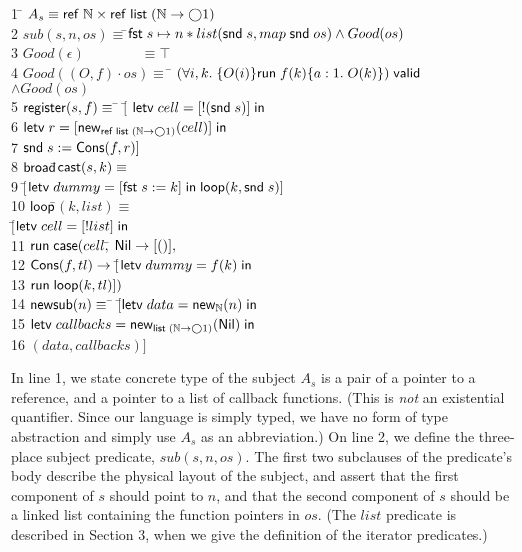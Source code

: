 \begin{tabbing}
1 \qquad \= $A_s \equiv \mathsf{ref}\;\mathbb{N} \times \mathsf{ref}\;\mathsf{list}\;{(\mathbb{N} \to \bigcirc{1})}$
\\[0.5em]
2 \> $sub(s, n, os) \equiv$\=$ \mathsf{fst}\; s \mapsto n * 
              list(\mathsf{snd}\; s, map\; \mathsf{snd}\; os) \land Good(os)$ 
\\[0.5em]
3 \> $Good(\epsilon) \!\qquad\qquad \equiv \top$ \\
4 \> $Good((O,f)\cdot os) \equiv\; $\=
   ${(\forall i,k.\; \{{O(i)}\}{\mathsf{run}\;{f(k)}}\{{a:1}.\;{O(k)}\})}\;\mathsf{valid}$ \\
  \> \>      $\land Good(os)$ 
\\[0.5em]
5 \> $\mathsf{register}(s, f) \equiv$ \=
         $[$\= $\mathsf{letv}\;cell = [!(\mathsf{snd}\; s)]\;\mathsf{in}\;$ \\
6 \> \> \> $\mathsf{letv}\;r = [\mathsf{new}_{\mathsf{ref}\;\mathsf{list}\;{(\mathbb{N} \to \bigcirc{1})}}(cell)]\;\mathsf{in}\;$ \\
7 \> \> \> $\mathsf{snd}\; s := \mathsf{Cons}(f, r)]$
\\[0.5em]

8  \> $\mathsf{broad}$\=$\mathsf{cast}(s, k) \equiv$ \\
9  \>  \> $[$\=$\mathsf{letv}\;dummy = [\mathsf{fst}\; s := k]\;\mathsf{in}\;\mathsf{loop}(k, \mathsf{snd}\; s)]$ \\


10 \> $\mathsf{loop}$\=$(k, list) \equiv $\\
   \>         \>$[$\=$\mathsf{letv}\;cell = [!list]\;\mathsf{in}\;$ \\
11 \>\>\> $\mathsf{run}\;{}\mathsf{case}(cell,$\= 
            $\mathsf{Nil} \to [()],$ \\
12 \>\>\>\> $\mathsf{Cons}(f, tl) \to [$\=$\mathsf{letv}\;dummy = f(k)\;\mathsf{in}\;$ \\
13  \>\>\>\> \> $\mathsf{run}\;{\mathsf{loop}(k,tl)}])$ \\[0.5em]
14 \> $\mathsf{new}\mathsf{sub}(n) \equiv$ \=
          $[$\=$\mathsf{letv}\;data = \mathsf{new}_{\mathbb{N}}(n)\;\mathsf{in}\;$ \\
15 \> \> \> $\mathsf{letv}\;callbacks = \mathsf{new}_{\mathsf{list}\;{(\mathbb{N} \to \bigcirc{1})}}(\mathsf{Nil})\;\mathsf{in}\;$ \\
16 \> \> \> $(data, callbacks)]$
\end{tabbing}


In line 1, we state concrete type of the subject $A_s$ is a pair of a
pointer to a reference, and a pointer to a list of callback
functions. (This is \emph{not} an existential quantifier.  Since our
language is simply typed, we have no form of type abstraction and
simply use $A_s$ as an abbreviation.)  On line 2, we define the
three-place subject predicate, $sub(s,n,os)$. The first two subclauses
of the predicate's body describe the physical layout of the subject,
and assert that the first component of $s$ should point to $n$, and
that the second component of $s$ should be a linked list containing
the function pointers in $os$. (The $list$ predicate is described in
Section 3, when we give the definition of the iterator predicates.)

